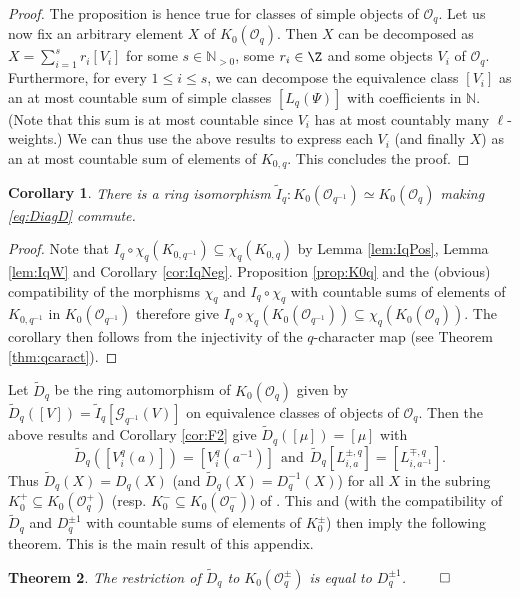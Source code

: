 \documentclass[11pt]{amsart}
\newtheorem{theorem}{Theorem}[section]
\newtheorem{cor}[theorem]{Corollary}
\theoremstyle{definition}
\theoremstyle{remark}
\numberwithin{equation}{section}
\begin{document}
\begin{proof}
The proposition is hence true for classes of simple objects of $\mathcal{O}_q$. Let us now fix an arbitrary element $X$ of $K_0(\mathcal{O}_q)$. Then $X$ can be decomposed as
$ X = \sum_{i=1}^s r_i [V_i]$
for some $s\in\mathbb{N}_{>0}$, some $r_i \in \Z$ and some objects $V_i$ of $\mathcal{O}_q$. Furthermore, for every $1 \leq i\leq s$, we can decompose the equivalence class $[V_i]$ as an at most countable sum of simple classes $[L_q(\Psi)]$ with coefficients in $\mathbb{N}$. (Note that this sum is at most countable since $V_i$ has at most countably many $\ell$-weights.) We can thus use the above results to express each $V_i$ (and finally $X$) as an at most countable sum of elements of $K_{0,q}$. This concludes the proof.
\end{proof}
\begin{cor} There is a ring isomorphism $\tilde{I}_q:K_0(\mathcal{O}_{q^{-1}})\simeq K_0(\mathcal{O}_q)$ making \eqref{eq:DiagD} commute.
\end{cor}
\begin{proof}
Note that $I_q \circ \chi_q(K_{0,q^{-1}}) \subseteq \chi_q(K_{0,q})$ by Lemma \ref{lem:IqPos}, Lemma \ref{lem:IqW} and Corollary \ref{cor:IqNeg}. Proposition \ref{prop:K0q} and the (obvious) compatibility of the morphisms $\chi_q$ and $I_q\circ\chi_q$ with countable sums of elements of $K_{0,q^{-1}}$ in $K_0(\mathcal{O}_{q^{-1}})$ therefore give $I_q\circ \chi_q(K_0(\mathcal{O}_{q^{-1}})) \subseteq \chi_q(K_0(\mathcal{O}_q))$. The corollary then follows from the injectivity of the $q$-character map (see Theorem \ref{thm:qcaract}).
\end{proof}
Let $\tilde{D}_q$ be the ring automorphism of $K_0(\mathcal{O}_q)$ given by $\tilde{D}_q([V]) = \tilde{I}_q[\mathcal{G}_{q^{-1}}(V)]$ on equivalence classes of objects of $\mathcal{O}_q$. Then the above results and Corollary \ref{cor:F2} give $\tilde{D}_q([\mu]) = [\mu]$ with
$$\tilde{D}_q([V_i^q(a)])=[V_i^q(a^{-1})] \ \ \text{and}\ \ \tilde{D}_q[L_{i,a}^{\pm,q}]=[L^{\mp,q}_{i,a^{-1}}].$$
Thus $\tilde{D}_q(X)=D_q(X)$ (and $\tilde{D}_q(X)=D_q^{-1}(X)$) for all $X$ in the subring $K_{0}^{+}\subseteq K_0(\mathcal{O}_q^{+})$ (resp. $K_{0}^{-}\subseteq K_0(\mathcal{O}_q^{-})$) of \cite[Section 5C]{hl2}. This and \cite[Proposition 5.16]{hl2} (with the compatibility of $\tilde{D}_q$ and $D_q^{\pm 1}$ with countable sums of elements of $K_{0}^{\pm}$) then imply the following theorem. This is the main result of this appendix.
\begin{theorem} The restriction of $\tilde{D}_q$ to $K_0(\mathcal{O}_q^{\pm})$ is equal to $D_q^{\pm 1}$. \hfill $\qed$
\end{theorem}
\end{document}
